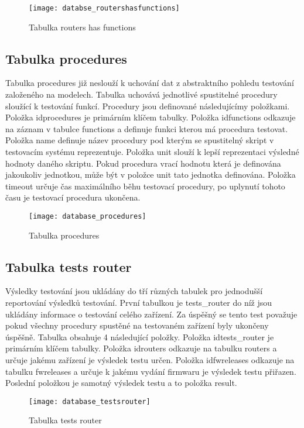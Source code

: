 \begin{figure}[h]
  \centering
  \texttt{[image: databse\_routershasfunctions]}
  \caption{Tabulka routers has functions}
  \label{fig:databse_routershasfunctions}
\end{figure}

\subsection{Tabulka procedures}
Tabulka procedures již neslouží k uchování dat z abstraktního pohledu testování založeného na modelech. Tabulka uchovává jednotlivé spustitelné procedury sloužící k testování funkcí. Procedury jsou definované následujícímy položkami. Položka idprocedures je primárním klíčem tabulky. Položka idfunctions odkazuje na záznam v tabulce functions a definuje funkci kterou má procedura testovat. Položka name definuje název procedury pod kterým se spustitelný skript v testovacím systému reprezentuje. Položka unit slouží k lepší reprezentaci výsledné hodnoty daného skriptu. Pokud procedura vrací hodnotu která je definována jakoukoliv jednotkou, může být v položce unit tato jednotka definována. Položka timeout určuje čas maximálního běhu testovací procedury, po uplynutí tohoto času je testovací procedura ukončena.

\begin{figure}[h]
  \centering
  \texttt{[image: database\_procedures]}
  \caption{Tabulka procedures}
  \label{fig:database_procedures}
\end{figure}

\subsection{Tabulka tests router}
Výsledky testování jsou ukládány do tří různých tabulek pro jednodušší reportování výsledků testování. První tabulkou je tests\_router do níž jsou ukládány informace o testování celého zařízení. Za úspěšný se tento test považuje pokud všechny procedury spustěné na testovaném zařízení byly ukončeny úspěšně. Tabulka obsahuje 4 následující položky. Položka idtests\_router je primárním klíčem tabulky. Položka idrouters odkazuje na tabulku routers a určuje jakému zařízení je výsledek testu určen. Položka idfwreleases odkazuje na tabulku fwreleases a určuje k jakému vydání firmwaru je výsledek testu přiřazen. Poslední položkou je samotný výsledek testu a to položka result.

\begin{figure}[h]
  \centering
  \texttt{[image: database\_testsrouter]}
  \caption{Tabulka tests router}
  \label{fig:database_testsrouter}
\end{figure}

